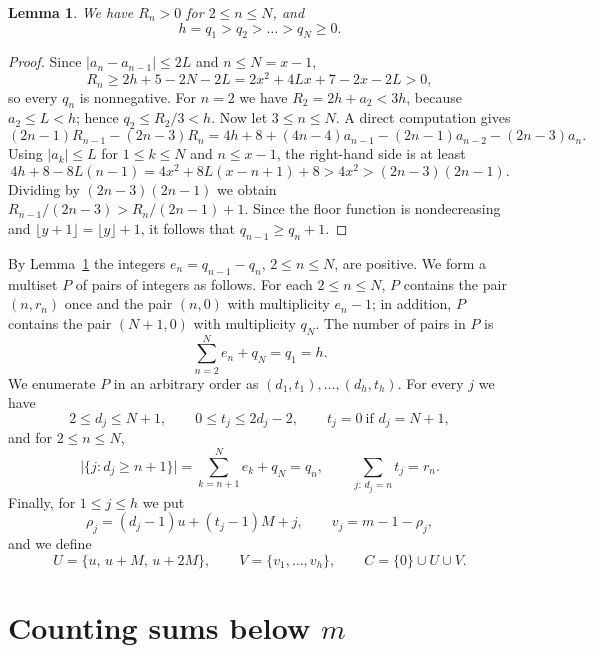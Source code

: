 \documentclass[11pt]{amsart}
\newtheorem{lemma}[theorem]{Lemma}
\theoremstyle{definition}
\theoremstyle{remark}
\numberwithin{equation}{section}
\begin{document}
\begin{lemma}\label{lem:decreasing}
We have $R_n>0$ for $2\le n\le N$, and
\[
h=q_1>q_2>\dots>q_N\ge 0.
\]
\end{lemma}

\begin{proof}
Since $|a_n-a_{n-1}|\le 2L$ and $n\le N=x-1$,
\[
R_n\ge 2h+5-2N-2L=2x^2+4Lx+7-2x-2L>0,
\]
so every $q_n$ is nonnegative. For $n=2$ we have $R_2=2h+a_2<3h$, because $a_2\le L<h$; hence $q_2\le R_2/3<h$. Now let $3\le n\le N$. A direct computation gives
\[
(2n-1)R_{n-1}-(2n-3)R_n=4h+8+(4n-4)a_{n-1}-(2n-1)a_{n-2}-(2n-3)a_n.
\]
Using $|a_k|\le L$ for $1\le k\le N$ and $n\le x-1$, the right-hand side is at least
\[
4h+8-8L(n-1)=4x^2+8L(x-n+1)+8>4x^2>(2n-3)(2n-1).
\]
Dividing by $(2n-3)(2n-1)$ we obtain $R_{n-1}/(2n-3)>R_n/(2n-1)+1$. Since the floor function is nondecreasing and $\lfloor y+1\rfloor=\lfloor y\rfloor+1$, it follows that $q_{n-1}\ge q_n+1$.
\end{proof}

By Lemma~\ref{lem:decreasing} the integers $e_n=q_{n-1}-q_n$, $2\le n\le N$, are positive. We form a multiset $P$ of pairs of integers as follows. For each $2\le n\le N$, $P$ contains the pair $(n,r_n)$ once and the pair $(n,0)$ with multiplicity $e_n-1$; in addition, $P$ contains the pair $(N+1,0)$ with multiplicity $q_N$. The number of pairs in $P$ is
\[
\sum_{n=2}^{N}e_n+q_N=q_1=h.
\]
We enumerate $P$ in an arbitrary order as $(d_1,t_1),\dots,(d_h,t_h)$. For every $j$ we have
\begin{equation}\label{eq:pair-bounds}
2\le d_j\le N+1,\qquad 0\le t_j\le 2d_j-2,\qquad t_j=0\ \text{if } d_j=N+1,
\end{equation}
and for $2\le n\le N$,
\begin{equation}\label{eq:pair-counts}
\bigl|\{j:d_j\ge n+1\}\bigr|=\sum_{k=n+1}^{N}e_k+q_N=q_n,\qquad \sum_{j:\,d_j=n}t_j=r_n.
\end{equation}
Finally, for $1\le j\le h$ we put
\begin{equation}\label{eq:rho}
\rho_j=(d_j-1)u+(t_j-1)M+j,\qquad v_j=m-1-\rho_j,
\end{equation}
and we define
\begin{equation}\label{eq:C}
U=\{u,\,u+M,\,u+2M\},\qquad V=\{v_1,\dots,v_h\},\qquad C=\{0\}\cup U\cup V.
\end{equation}

\section{Counting sums below \texorpdfstring{$m$}{m}}\label{sec:counting}
\end{document}
